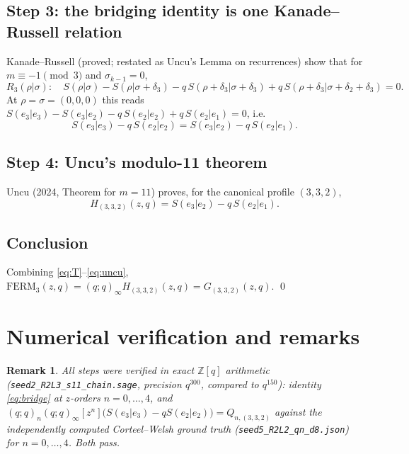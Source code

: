 \documentclass[11pt]{article}
\newtheorem{remark}[theorem]{Remark}
\newcommand{\poch}[1]{(q;q)_{#1}}
\begin{document}
\subsection*{Step 3: the bridging identity is one Kanade--Russell relation}
Kanade--Russell (proved; restated as Uncu's Lemma on recurrences) show that
for $m\equiv-1\pmod 3$ and $\sigma_{k-1}=0$,
\[
R_3(\rho|\sigma):\quad
S(\rho|\sigma)-S(\rho|\sigma+\delta_3)
-q\,S(\rho+\delta_3|\sigma+\delta_3)
+q\,S(\rho+\delta_3|\sigma+\delta_2+\delta_3)=0.
\]
At $\rho=\sigma=(0,0,0)$ this reads
$S(e_3|e_3)-S(e_3|e_2)-q\,S(e_2|e_2)+q\,S(e_2|e_1)=0$, i.e.
\begin{equation}\label{eq:bridge}
S(e_3|e_3)-q\,S(e_2|e_2)=S(e_3|e_2)-q\,S(e_2|e_1).
\end{equation}

\subsection*{Step 4: Uncu's modulo-11 theorem}
Uncu (2024, Theorem for $m=11$) proves, for the canonical profile
$(3,3,2)$,
\begin{equation}\label{eq:uncu}
H_{(3,3,2)}(z,q)=S(e_3|e_2)-q\,S(e_2|e_1).
\end{equation}

\subsection*{Conclusion}
Combining \eqref{eq:T}--\eqref{eq:uncu},
$\mathrm{FERM}_3(z,q)=(q;q)_\infty H_{(3,3,2)}(z,q)=G_{(3,3,2)}(z,q)$.
\qed

\section{Numerical verification and remarks}

\begin{remark}
All steps were verified in exact $\mathbb{Z}[q]$ arithmetic
(\texttt{seed2\_R2L3\_s11\_chain.sage}, precision $q^{300}$, compared to
$q^{150}$): identity \eqref{eq:bridge} at $z$-orders $n=0,\dots,4$, and
$\poch{n}(q;q)_\infty[z^n]\bigl(S(e_3|e_3)-qS(e_2|e_2)\bigr)=Q_{n,(3,3,2)}$
against the independently computed Corteel--Welsh ground truth
(\texttt{seed5\_R2L2\_qn\_d8.json}) for $n=0,\dots,4$. Both pass.
\end{remark}
\end{document}
